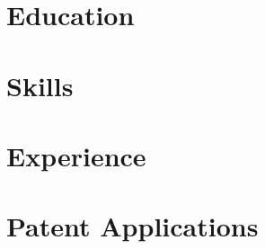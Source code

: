 \documentclass[letterpaper,11pt]{article}
\begin{document}


\section{Education}


\section{Skills}


\section{Experience}






\renewcommand\refname{Research}
\nocite{gardner_definition_2022}
\nocite{gardner_isods_2021}
\nocite{gardner_emg_2020}



\section{Patent Applications}

\end{document}

